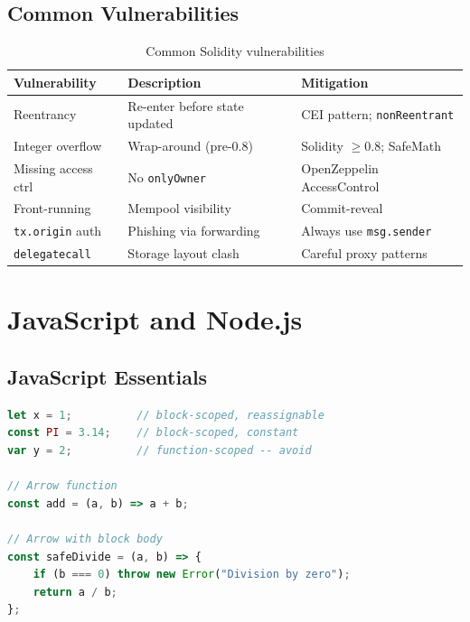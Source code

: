 \documentclass[12pt,a4paper,openany]{book}
\theoremstyle{definition}
\theoremstyle{plain}
\theoremstyle{remark}
\begin{document}
\section{Common Vulnerabilities}

\begin{table}[h]
\centering
\caption{Common Solidity vulnerabilities}
\begin{tabular}{p{3cm}p{4.5cm}p{4cm}}
\toprule
\textbf{Vulnerability} & \textbf{Description} & \textbf{Mitigation} \\
\midrule
Reentrancy & Re-enter before state updated & CEI pattern; \texttt{nonReentrant} \\
Integer overflow & Wrap-around (pre-0.8) & Solidity $\geq 0.8$; SafeMath \\
Missing access ctrl & No \texttt{onlyOwner} & OpenZeppelin AccessControl \\
Front-running & Mempool visibility & Commit-reveal \\
\texttt{tx.origin} auth & Phishing via forwarding & Always use \texttt{msg.sender} \\
\texttt{delegatecall} & Storage layout clash & Careful proxy patterns \\
\bottomrule
\end{tabular}
\end{table}


\chapter{JavaScript and Node.js}
\label{chap:js}

\section{JavaScript Essentials}

\begin{lstlisting}[language=JavaScript,caption=Variables and functions]
let x = 1;          // block-scoped, reassignable
const PI = 3.14;    // block-scoped, constant
var y = 2;          // function-scoped -- avoid

// Arrow function
const add = (a, b) => a + b;

// Arrow with block body
const safeDivide = (a, b) => {
    if (b === 0) throw new Error("Division by zero");
    return a / b;
};
\end{lstlisting}
\end{document}
